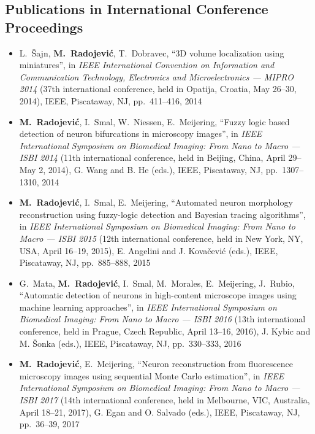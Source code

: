 \subsection*{Publications in International Conference Proceedings}
\vspace{1ex}
\begin{itemize}
	\item L.~\v{S}ajn, \textbf{M.~Radojevi\'{c}}, T.~Dobravec, ``3D volume localization using miniatures'', in \emph{IEEE International Convention on Information and Communication Technology, Electronics and Microelectronics --- MIPRO 2014} (37th international conference, held in Opatija, Croatia, May 26--30, 2014), IEEE, Piscataway, NJ, pp.~411--416, 2014

	\item \textbf{M.~Radojevi\'{c}}, I.~Smal, W.~Niessen, E.~Meijering, ``Fuzzy logic based detection of neuron bifurcations in microscopy images'', in \emph{IEEE International Symposium on Biomedical Imaging: From Nano to Macro --- ISBI 2014} (11th international conference, held in Beijing, China, April 29--May 2, 2014), G. Wang and B. He (eds.), IEEE, Piscataway, NJ, pp.~1307--1310, 2014

	\item \textbf{M.~Radojevi\'{c}}, I.~Smal, E.~Meijering, ``Automated neuron morphology reconstruction using fuzzy-logic detection and Bayesian tracing algorithms'', in \emph{IEEE International Symposium on Biomedical Imaging: From Nano to Macro --- ISBI 2015} (12th international conference, held in New York, NY, USA, April 16--19, 2015), E. Angelini and J. Kova\v{c}evi\'{c} (eds.), IEEE, Piscataway, NJ, pp.~885--888, 2015

	\item G.~Mata, \textbf{M.~Radojevi\'{c}}, I.~Smal, M.~Morales, E.~Meijering, J.~Rubio, ``Automatic detection of neurons in high-content microscope images using machine learning approaches'', in \emph{IEEE International Symposium on Biomedical Imaging: From Nano to Macro --- ISBI 2016} (13th international conference, held in Prague, Czech Republic, April 13--16, 2016), J. Kybic and M. \v{S}onka (eds.), IEEE, Piscataway, NJ, pp.~330--333, 2016

	\item \textbf{M.~Radojevi\'{c}}, E.~Meijering, ``Neuron reconstruction from fluorescence microscopy images using sequential Monte Carlo estimation'', in \emph{IEEE International Symposium on Biomedical Imaging: From Nano to Macro --- ISBI 2017} (14th international conference, held in Melbourne, VIC, Australia, April 18--21, 2017), G. Egan and O. Salvado (eds.), IEEE, Piscataway, NJ, pp.~36--39, 2017 

\end{itemize}

\normalsize
